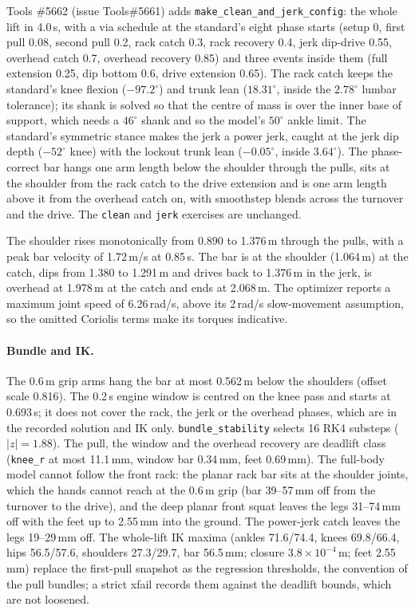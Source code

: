 \documentclass[11pt,a4paper]{article}
\begin{document}
Tools \#5662 (issue Tools\#5661) adds \texttt{make\_clean\_and\_jerk\_config}:
the whole lift in 4.0\,s, with a via schedule at the standard's eight phase
starts (setup 0, first pull 0.08, second pull 0.2, rack catch 0.3, rack
recovery 0.4, jerk dip-drive 0.55, overhead catch 0.7, overhead recovery
0.85) and three events inside them (full extension 0.25, dip bottom 0.6,
drive extension 0.65). The rack catch keeps the standard's knee flexion
($-97.2^\circ$) and trunk lean ($18.31^\circ$, inside the $2.78^\circ$
lumbar tolerance); its shank is solved so that the centre of mass is over
the inner base of support, which needs a $46^\circ$ shank and so the model's
$50^\circ$ ankle limit. The standard's symmetric stance makes the jerk a
power jerk, caught at the jerk dip depth ($-52^\circ$ knee) with the
lockout trunk lean ($-0.05^\circ$, inside $3.64^\circ$). The phase-correct
bar hangs one arm length below the shoulder through the pulls, sits at the
shoulder from the rack catch to the drive extension and is one arm length
above it from the overhead catch on, with smoothstep blends across the
turnover and the drive. The \texttt{clean} and \texttt{jerk} exercises are
unchanged.

The shoulder rises monotonically from 0.890 to 1.376\,m through the pulls,
with a peak bar velocity of 1.72\,m/s at 0.85\,s. The bar is at the
shoulder (1.064\,m) at the catch, dips from 1.380 to 1.291\,m and drives back
to 1.376\,m in the jerk, is overhead at 1.978\,m at the catch and ends at
2.068\,m. The optimizer reports a maximum joint speed of 6.26\,rad/s, above
its 2\,rad/s slow-movement assumption, so the omitted Coriolis terms make its
torques indicative.

\paragraph{Bundle and IK.} The 0.6\,m grip arms hang the bar at most
0.562\,m below the shoulders (offset scale 0.816). The 0.2\,s engine window
is centred on the knee pass and starts at 0.693\,s; it does not cover the
rack, the jerk or the overhead phases, which are in the recorded solution
and IK only. \texttt{bundle\_stability} selects 16 RK4 substeps
($|z|=1.88$). The pull, the window and the overhead recovery are deadlift
class (\texttt{knee\_r} at most 11.1\,mm, window bar 0.34\,mm, feet
0.69\,mm). The full-body model cannot follow the front rack: the planar rack
bar sits at the shoulder joints, which the hands cannot reach at the
0.6\,m grip (bar 39--57\,mm off from the turnover to the drive), and the
deep planar front squat leaves the legs 31--74\,mm off with the feet up to
2.55\,mm into the ground. The power-jerk catch leaves the legs 19--29\,mm
off. The whole-lift IK maxima (ankles 71.6/74.4, knees 69.8/66.4, hips
56.5/57.6, shoulders 27.3/29.7, bar 56.5\,mm; closure
$3.8\times10^{-4}$\,m; feet 2.55\,mm) replace the first-pull snapshot as the
regression thresholds, the convention of the pull bundles; a strict xfail
records them against the deadlift bounds, which are not loosened.
\end{document}
